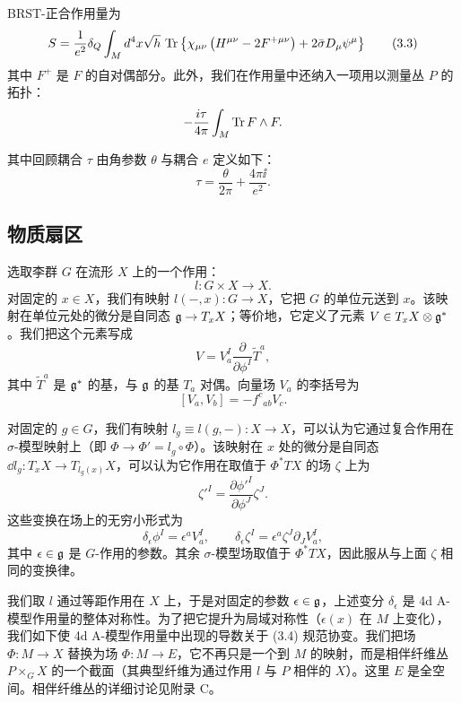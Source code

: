 BRST-正合作用量为
\begin{equation}
  S=\frac{1}{e^2}\delta_Q\int_Md^4x\sqrt{h}\,\operatorname{Tr}\left\{\chi_{\mu\nu}\left(H^{\mu\nu}-2F^{+\mu\nu}\right)+2\bar\sigma D_\mu\psi^\mu\right\} \tag{3.3}
\end{equation}
其中 $F^+$ 是 $F$ 的自对偶部分。此外，我们在作用量中还纳入一项用以测量丛 $P$ 的拓扑：
\[
  -\frac{i\tau}{4\pi}\int_M\operatorname{Tr} F\wedge F.
\]

其中回顾耦合 $\tau$ 由角参数 $\theta$ 与耦合 $e$ 定义如下：
\[
  \tau=\frac{\theta}{2\pi}+\frac{4\pi\ii}{e^2}.
\]

\subsection{物质扇区}

选取李群 $G$ 在流形 $X$ 上的一个作用：
\[
  l:G\times X\to X.
\]
对固定的 $x\in X$，我们有映射 $l(-,x):G\to X$，它把 $G$ 的单位元送到 $x$。该映射在单位元处的微分是自同态 $\mathfrak{g}\to T_xX$；等价地，它定义了元素 $V\in T_xX\otimes\mathfrak{g}^*$。我们把这个元素写成
\[
  V=V^I_a\frac{\partial}{\partial\phi^I}\tilde{T}^a,
\]
其中 $\tilde{T}^a$ 是 $\mathfrak{g}^*$ 的基，与 $\mathfrak{g}$ 的基 $T_a$ 对偶。向量场 $V_a$ 的李括号为
\[
  [V_a,V_b]=-f^c{}_{ab}V_c.
\]

对固定的 $g\in G$，我们有映射 $l_g\equiv l(g,-):X\to X$，可以认为它通过复合作用在 $\sigma$-模型映射上（即 $\Phi\to\Phi'=l_g\circ\Phi$）。该映射在 $x$ 处的微分是自同态 $\dd l_g:T_xX\to T_{l_g(x)}X$，可以认为它作用在取值于 $\Phi^*TX$ 的场 $\zeta$ 上为
\[
  \zeta'^I=\frac{\partial\phi'^I}{\partial\phi^J}\zeta^J.
\]
这些变换在场上的无穷小形式为
\begin{equation}
  \delta_\epsilon\phi^I=\epsilon^aV^I_a,\qquad
  \delta_\epsilon\zeta^I=\epsilon^a\zeta^J\partial_JV^I_a, \tag{3.4}
\end{equation}
其中 $\epsilon\in\mathfrak{g}$ 是 $G$-作用的参数。其余 $\sigma$-模型场取值于 $\Phi^*TX$，因此服从与上面 $\zeta$ 相同的变换律。

我们取 $l$ 通过等距作用在 $X$ 上，于是对固定的参数 $\epsilon\in\mathfrak{g}$，上述变分 $\delta_\epsilon$ 是 4d A-模型作用量的整体对称性。为了把它提升为局域对称性（$\epsilon(x)$ 在 $M$ 上变化），我们如下使 4d A-模型作用量中出现的导数关于 (3.4) 规范协变。我们把场 $\Phi:M\to X$ 替换为场 $\Phi:M\to E$，它不再只是一个到 $M$ 的映射，而是相伴纤维丛 $P\times_GX$ 的一个截面（其典型纤维为通过作用 $l$ 与 $P$ 相伴的 $X$）。这里 $E$ 是全空间。相伴纤维丛的详细讨论见附录 C。


